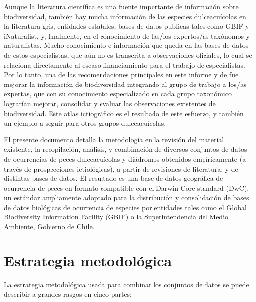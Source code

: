 \documentclass[sn-apa,pdflatex]{sn-jnl}
\begin{document}
Aunque la literatura científica es una fuente importante de información
sobre biodiversidad, también hay mucha información de las especies
dulceacuícolas en la literatura gris, entidades estatales, bases de
datos publicas tales como GBIF y iNaturalist, y, finalmente, en el
conocimiento de las/los expertos/as taxónomos y naturalistas. Mucho
conocimiento e información que queda en las bases de datos de estos
especialistas, que aún no es transcrita a observaciones oficiales, lo
cual se relaciona directamente al escaso financiamiento para el trabajo
de especialistas. Por lo tanto, una de las recomendaciones principales
en este informe y de \citet{Reid2021} fue mejorar la información de
biodiversidad integrando al grupo de trabajo a los/as expertas, que con
su conocimiento especializado en cada grupo taxonómico lograrían
mejorar, consolidar y evaluar las observaciones existentes de
biodiversidad. Este atlas ictiográfico es el resultado de este esfuerzo,
y también un ejemplo a seguir para otros grupos dulceacuícolas.

El presente documento detalla la metodología en la revisión del material
existente, la recopilación, análisis, y combinación de diversos
conjuntos de datos de ocurrencias de peces dulceacuícolas y diádromos
obtenidos empíricamente (a través de prospecciones ictiológicas), a
partir de revisiones de literatura, y de distintas bases de datos. El
resultado es una base de datos geográfica de ocurrencia de peces en
formato compatible con el Darwin Core standard (DwC), un estándar
ampliamente adoptado para la distribución y consolidación de bases de
datos biológicas de ocurrencia de especies por entidades tales como el
Global Biodiversity Information Facility
(\href{https://www.gbif.org/}{GBIF}) o la Superintendencia del Medio
Ambiente, Gobierno de Chile.

\section{Estrategia metodológica}\label{sec2}

La estrategia metodológica usada para combinar los conjuntos de datos se
puede describir a grandes rasgos en cinco partes:
\end{document}
